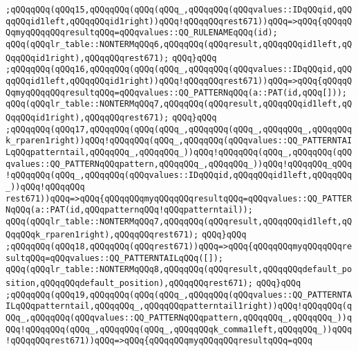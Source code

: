 \verb|;qQQqqQQq(qQQq15,qQQqqQQq(qQQq(qQQq_,qQQqqQQq(qQQqvalues::IDqQQqid,qQQqqQQqid1left,qQQqqQQqid1right))qQQq!qQQqqQQqrest671))qQQq=>qQQq{qQQqqQQqmyqQQqqQQqresultqQQq=qQQqvalues::QQ_RULENAMEqQQq(id);|\newline
\verb|qQQq(qQQqlr_table::NONTERMqQQq6,qQQqqQQq(qQQqresult,qQQqqQQqid1left,qQQqqQQqid1right),qQQqqQQqrest671);|\newline
\verb|qQQq}qQQq|\newline
\verb|;qQQqqQQq(qQQq16,qQQqqQQq(qQQq(qQQq_,qQQqqQQq(qQQqvalues::IDqQQqid,qQQqqQQqid1left,qQQqqQQqid1right))qQQq!qQQqqQQqrest671))qQQq=>qQQq{qQQqqQQqmyqQQqqQQqresultqQQq=qQQqvalues::QQ_PATTERNqQQq(a::PAT(id,qQQq[]));|\newline
\verb|qQQq(qQQqlr_table::NONTERMqQQq7,qQQqqQQq(qQQqresult,qQQqqQQqid1left,qQQqqQQqid1right),qQQqqQQqrest671);|\newline
\verb|qQQq}qQQq|\newline
\verb|;qQQqqQQq(qQQq17,qQQqqQQq(qQQq(qQQq_,qQQqqQQq(qQQq_,qQQqqQQq_,qQQqqQQqk_rparen1right))qQQq!qQQqqQQq(qQQq_,qQQqqQQq(qQQqvalues::QQ_PATTERNTAILqQQqpatterntail,qQQqqQQq_,qQQqqQQq_))qQQq!qQQqqQQq(qQQq_,qQQqqQQq(qQQqvalues::QQ_PATTERNqQQqpattern,qQQqqQQq_,qQQqqQQq_))qQQq!qQQqqQQq_qQQq!qQQqqQQq(qQQq_,qQQqqQQq(qQQqvalues::IDqQQqid,qQQqqQQqid1left,qQQqqQQq_))qQQq!qQQqqQQq|\newline
\verb|rest671))qQQq=>qQQq{qQQqqQQqmyqQQqqQQqresultqQQq=qQQqvalues::QQ_PATTERNqQQq(a::PAT(id,qQQqpatternqQQq!qQQqpatterntail));|\newline
\verb|qQQq(qQQqlr_table::NONTERMqQQq7,qQQqqQQq(qQQqresult,qQQqqQQqid1left,qQQqqQQqk_rparen1right),qQQqqQQqrest671);|\newline
\verb|qQQq}qQQq|\newline
\verb|;qQQqqQQq(qQQq18,qQQqqQQq(qQQqrest671))qQQq=>qQQq{qQQqqQQqmyqQQqqQQqresultqQQq=qQQqvalues::QQ_PATTERNTAILqQQq([]);|\newline
\verb|qQQq(qQQqlr_table::NONTERMqQQq8,qQQqqQQq(qQQqresult,qQQqqQQqdefault_position,qQQqqQQqdefault_position),qQQqqQQqrest671);|\newline
\verb|qQQq}qQQq|\newline
\verb|;qQQqqQQq(qQQq19,qQQqqQQq(qQQq(qQQq_,qQQqqQQq(qQQqvalues::QQ_PATTERNTAILqQQqpatterntail,qQQqqQQq_,qQQqqQQqpatterntail1right))qQQq!qQQqqQQq(qQQq_,qQQqqQQq(qQQqvalues::QQ_PATTERNqQQqpattern,qQQqqQQq_,qQQqqQQq_))qQQq!qQQqqQQq(qQQq_,qQQqqQQq(qQQq_,qQQqqQQqk_comma1left,qQQqqQQq_))qQQq!qQQqqQQqrest671))qQQq=>qQQq{qQQqqQQqmyqQQqqQQqresultqQQq=qQQq|\newline
